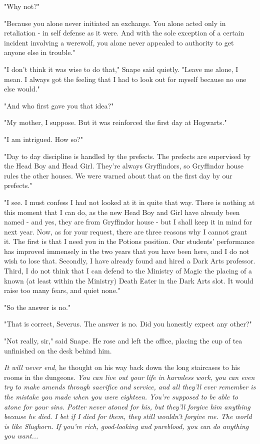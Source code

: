 "Why not?"

"Because you alone never initiated an exchange. You alone acted only in retaliation - in self defense as it were. And with the sole exception of a certain incident involving a werewolf, you alone never appealed to authority to get anyone else in trouble."

"I don't think it was wise to do that," Snape said quietly. "Leave me alone, I mean. I always got the feeling that I had to look out for myself because no one else would."

"And who first gave you that idea?"

"My mother, I suppose. But it was reinforced the first day at Hogwarts."

"I am intrigued. How so?"

"Day to day discipline is handled by the prefects. The prefects are supervised by the Head Boy and Head Girl. They're always Gryffindors, so Gryffindor house rules the other houses. We were warned about that on the first day by our prefects."

"I see. I must confess I had not looked at it in quite that way. There is nothing at this moment that I can do, as the new Head Boy and Girl have already been named - and yes, they are from Gryffindor house - but I shall keep it in mind for next year. Now, as for your request, there are three reasons why I cannot grant it. The first is that I need you in the Potions position. Our students' performance has improved immensely in the two years that you have been here, and I do not wish to lose that. Secondly, I have already found and hired a Dark Arts professor. Third, I do not think that I can defend to the Ministry of Magic the placing of a known (at least within the Ministry) Death Eater in the Dark Arts slot. It would raise too many fears, and quiet none."

"So the answer is no."

"That is correct, Severus. The answer is no. Did you honestly expect any other?"

"Not really, sir," said Snape. He rose and left the office, placing the cup of tea unfinished on the desk behind him.

\emph{It will never end}, he thought on his way back down the long staircases to his rooms in the dungeons. \emph{You can live out your life in harmless work, you can even try to make amends through sacrifice and service, and all they'll ever remember is the mistake you made when you were eighteen. You're supposed to be able to atone for your sins. Potter never atoned for his, but they'll forgive him anything because he died. I bet if I died for them, they still wouldn't forgive me. The world is like Slughorn. If you're rich, good-looking and pureblood, you can do anything you want...}

